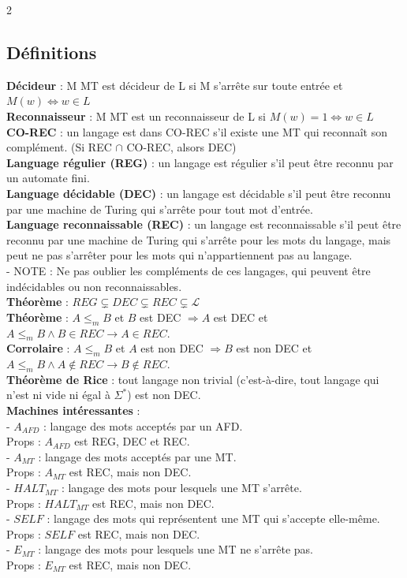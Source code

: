 \documentclass[11pt]{article}
\begin{document}
\begin{multicols}{2}
  \subsection{Définitions}
  \textbf{Décideur} : M MT est décideur de L si M s'arrête sur toute entrée et $M(w) \iff w \in L$\\
  \textbf{Reconnaisseur} : M MT est un reconnaisseur de L si $M(w)=1 \iff w \in L$\\
  \textbf{CO-REC} : un langage est dans CO-REC s'il existe une MT qui reconnaît son complément.
  (Si REC $\cap$ CO-REC, alsors DEC)\\
  \textbf{Language régulier (REG)} : un langage est régulier s'il peut être reconnu par un automate fini.\\
  \textbf{Language décidable (DEC)} : un langage est décidable s'il peut être reconnu par une machine de Turing qui s'arrête pour tout mot d'entrée.\\
  \textbf{Language reconnaissable (REC)} : un langage est reconnaissable s'il peut être reconnu par une machine de Turing qui s'arrête pour les mots du langage, mais peut ne pas s'arrêter pour les mots qui n'appartiennent pas au langage.\\
  - NOTE : Ne pas oublier les compléments de ces langages, qui peuvent être indécidables ou non reconnaissables.\\
  \textbf{Théorème} : $REG \subsetneq DEC \subsetneq REC \subsetneq \mathcal{L}$\\
  \textbf{Théorème} : $A \leq_m B$ et $B$ est DEC $\Rightarrow A$ est DEC et $A \leq_m B \wedge B \in REC \rightarrow A \in REC$.\\
  \textbf{Corrolaire} : $A \leq_m B$ et $A$ est non DEC $\Rightarrow B$ est non DEC et $A \leq_m B \wedge A \notin REC \rightarrow B \notin REC$.\\
  \textbf{Théorème de Rice} : tout langage non trivial (c'est-à-dire, tout langage qui n'est ni vide ni égal à $\Sigma^*$) est non DEC.\\
  \textbf{Machines intéressantes} :\\
  - \underline{$A_{AFD}$} : langage des mots acceptés par un AFD.\\
  \indent \* Props : $A_{AFD}$ est REG, DEC et REC.\\
  - \underline{$A_{MT}$} : langage des mots acceptés par une MT.\\
  \indent \* Props : $A_{MT}$ est REC, mais non DEC.\\
  - \underline{$HALT_{MT}$} : langage des mots pour lesquels une MT s'arrête.\\
  \indent \* Props : $HALT_{MT}$ est REC, mais non DEC.\\
  - \underline{$SELF$} : langage des mots qui représentent une MT qui s'accepte elle-même.\\
  \indent \* Props : $SELF$ est REC, mais non DEC.\\
  - \underline{$E_{MT}$} : langage des mots pour lesquels une MT ne s'arrête pas.\\
  \indent \* Props : $E_{MT}$ est REC, mais non DEC.\\

\end{multicols}
\end{document}
